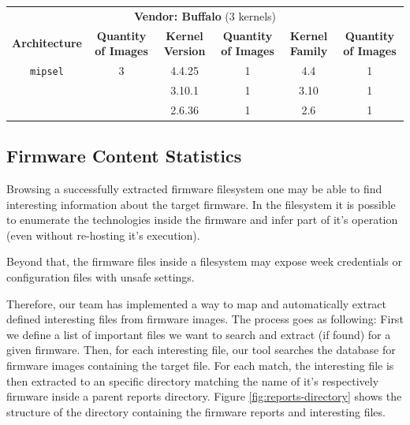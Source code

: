 \begin{table}[H]
{\begin{tabular}{cccccc}
\multicolumn{6}{c}{\textbf{Vendor: Buffalo} (3 kernels)}                                                                    \\
\textbf{Architecture} & \multicolumn{1}{c|}{\textbf{Quantity of Images}} & \textbf{Kernel Version} & \multicolumn{1}{c|}{\textbf{Quantity of Images}} & \textbf{Kernel Family} & \textbf{Quantity of Images} \\ \hline
{\tt mipsel}            & \multicolumn{1}{c|}{3}                & 4.4.25                 & \multicolumn{1}{c|}{1}                            & 4.4                     & 1                          \\
                        & \multicolumn{1}{c|}{}                 & 3.10.1                  & \multicolumn{1}{c|}{1}                           & 3.10                    & 1                          \\
                        & \multicolumn{1}{c|}{}                 & 2.6.36                  & \multicolumn{1}{c|}{1}                           & 2.6                     & 1                          \\ \hline
\end{tabular}}
\label{tab:kernel-stats-by-vendor}
\end{table}

\subsection{Firmware Content Statistics}
\label{sec:firmware-content-statistics}

Browsing a successfully extracted firmware filesystem one may be able to find interesting information about the target firmware. In the filesystem it is possible to enumerate the technologies inside the firmware and infer part of it's operation (even without re-hosting it's execution).

Beyond that, the firmware files inside a filesystem may expose week credentials or configuration files with unsafe settings.

Therefore, our team has implemented a way to map and automatically extract defined interesting files from firmware images. The process goes as following: First we define a list of important files we want to search and extract (if found) for a given firmware. Then, for each interesting file, our tool searches the database for firmware images containing the target file. For each match, the interesting file is then extracted to an specific directory matching the name of it's respectively firmware inside a parent reports directory. Figure \ref{fig:reports-directory} shows the structure of the directory containing the firmware reports and interesting files.

